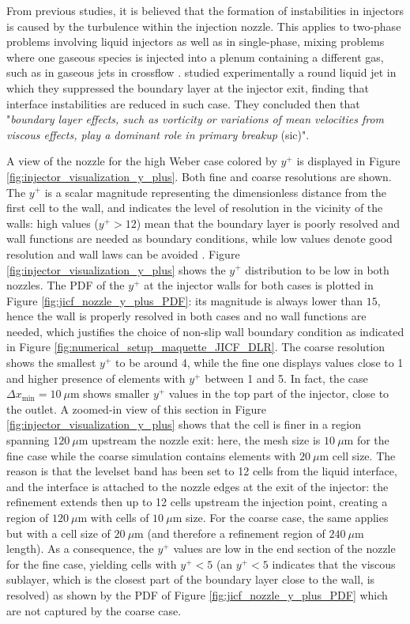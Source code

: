 From previous studies, it is believed that the formation of instabilities in injectors is caused by the turbulence within the injection nozzle. This applies to two-phase problems involving liquid injectors 
as well as in single-phase, mixing problems where one gaseous species is injected into a plenum containing a different gas, such as in gaseous jets in crossflow . \citeColor[wu_effects_1994] studied experimentally a round liquid jet in which they suppressed the boundary layer at the injector exit, finding that interface instabilities are reduced in such case. They concluded then that "\textsl{boundary layer effects, such as vorticity or variations of mean velocities from viscous effects, play a dominant role in primary breakup} (sic)".

A view of the nozzle for the high Weber case colored by $y^+$ is displayed in Figure \ref{fig:injector_visualization_y_plus}. Both fine and coarse resolutions are shown. The $y^+$ is a scalar magnitude representing the dimensionless distance from the first cell to the wall, and indicates the level of resolution in the vicinity of the walls: high values ($y^+ > 12$) mean that the boundary layer is poorly resolved and wall functions are needed as boundary conditions, while low values denote good resolution and wall laws can be avoided . Figure \ref{fig:injector_visualization_y_plus} shows the $y^+$ distribution to be low in both nozzles. The PDF of the $y^+$ at the injector walls for both cases is plotted in Figure \ref{fig:jicf_nozzle_y_plus_PDF}: its magnitude is always lower than $15$, hence the wall is properly resolved in both cases and no wall functions are needed, which justifies the choice of non-slip wall boundary condition as indicated in Figure \ref{fig:numerical_setup_maquette_JICF_DLR}.  The coarse resolution shows the smallest $y^+$ to be around 4, while the fine one displays values close to 1 and higher presence of elements with $y^+$ between 1 and 5. In fact, the case $\Delta x_\mathrm{min} = 10 ~\mu$m shows smaller $y^+$ values in the top part of the injector, close to the outlet. A zoomed-in view of this section in Figure \ref{fig:injector_visualization_y_plus} shows that the cell is finer in a region spanning $120~ \mu$m upstream the nozzle exit: here, the mesh size is $10~ \mu$m for the fine case while the coarse simulation contains elements with $20 ~\mu$m cell size. The reason is that the levelset band has been set to 12 cells from the liquid interface, and the interface is attached to the nozzle edges at the exit of the injector: the refinement extends then up to 12 cells upstream the injection point, creating a region of $120~\mu$m with cells of $10~\mu$m size. For the coarse case, the same applies but with a cell size of $20~\mu$m (and therefore a refinement region of $240~\mu$m length). As a consequence, the $y^+$ values are low in the end section of the nozzle for the fine case, yielding cells with $y^+ < 5$ (an $y^+ < 5$ indicates that the viscous sublayer, which is the closest part of the boundary layer close to the wall, is resolved) as shown by the PDF of Figure \ref{fig:jicf_nozzle_y_plus_PDF} which are not captured by the coarse case. 


